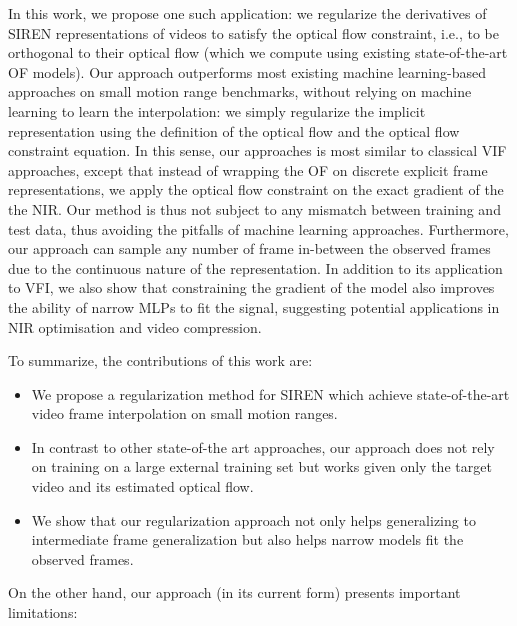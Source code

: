 \documentclass{article}
\begin{document}
In this work, we propose one such application:
we regularize the derivatives of SIREN representations of videos to satisfy the optical flow constraint, i.e., to be orthogonal to their optical flow 
(which we compute using existing state-of-the-art OF models).
Our approach outperforms most existing machine learning-based approaches on small motion range benchmarks,
without relying on machine learning to learn the interpolation:
we simply regularize the implicit representation using the definition
of the optical flow and the optical flow constraint equation.
In this sense, our approaches is most similar to classical VIF approaches,
except that instead of wrapping the OF on discrete explicit frame representations,
we apply the optical flow constraint on the exact gradient of the the NIR.
Our method is thus not subject to any mismatch between training and test data,
thus avoiding the pitfalls of machine learning approaches.
Furthermore, our approach can sample any number of frame in-between the observed frames due to the continuous nature of the representation.
In addition to its application to VFI, we also show that constraining the gradient of the model also improves the ability of narrow MLPs to fit the signal,
suggesting potential applications in NIR optimisation and video compression.

To summarize, the contributions of this work are:
\begin{itemize}
\item We propose a regularization method for SIREN which achieve state-of-the-art video frame interpolation on small motion ranges.
\item In contrast to other state-of-the art approaches, our approach does not rely on training on a large external training set but works given only the target video and its estimated optical flow.
\item We show that our regularization approach not only helps generalizing to intermediate frame generalization but also helps narrow models fit the observed frames.
\end{itemize}

On the other hand, our approach (in its current form) presents important limitations:
\end{document}
